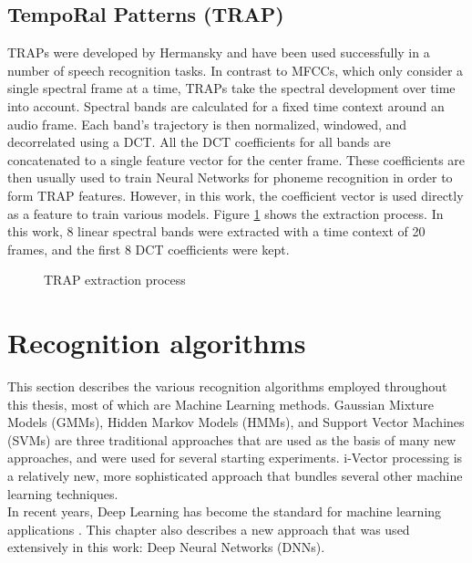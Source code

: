 \subsection{TempoRal Patterns (TRAP)} 
TRAPs were developed by Hermansky \cite{traps1} \cite{traps2} and have been used successfully in a number of speech recognition tasks. In contrast to MFCCs, which only consider a single spectral frame at a time, TRAPs take the spectral development over time into account. Spectral bands are calculated for a fixed time context around an audio frame. Each band's trajectory is then normalized, windowed, and decorrelated using a DCT. All the DCT coefficients for all bands are concatenated to a single feature vector for the center frame. These coefficients are then usually used to train Neural Networks for phoneme recognition \cite{yan_barnard}\cite{matejka} in order to form TRAP features.  However, in this work, the coefficient vector is used directly as a feature to train various models. Figure \ref{fig:traps} shows the extraction process. In this work, 8 linear spectral bands were extracted with a time context of 20 frames, and the first 8 DCT coefficients were kept.
\begin{figure}
 \centerline{}
 \caption{TRAP extraction process \cite{jens}}
 \label{fig:traps}
\end{figure}


\section{Recognition algorithms}
This section describes the various recognition algorithms employed throughout this thesis, most of which are Machine Learning methods. 
Gaussian Mixture Models (GMMs), Hidden Markov Models (HMMs), and Support Vector Machines (SVMs) are three traditional approaches that are used as the basis of many new approaches, and were used for several starting experiments. i-Vector processing is a relatively new, more sophisticated approach that bundles several other machine learning techniques.\\
In recent years, Deep Learning has become the standard for machine learning applications \cite{}. This chapter also describes a new approach that was used extensively in this work: Deep Neural Networks (DNNs).

